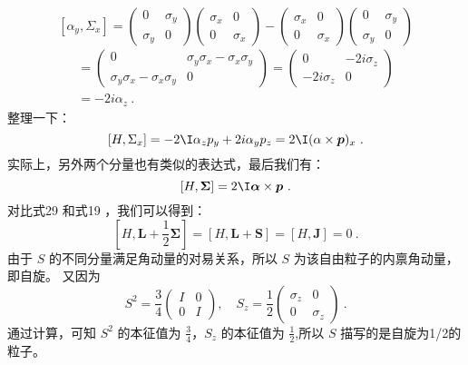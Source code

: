 \begin{equation}
\left[\alpha_{y}, \Sigma_{x}\right] = \left(\begin{array}{cc}
0 & \sigma_{y} \\
\sigma_{y} & 0
\end{array}\right)\left(\begin{array}{cc}
\sigma_{x} & 0 \\
0 & \sigma_{x}
\end{array}\right)-\left(\begin{array}{cc}
\sigma_{x} & 0 \\
0 & \sigma_{x}
\end{array}\right)\left(\begin{array}{cc}
0 & \sigma_{y} \\
\sigma_{y} & 0
\end{array}\right)
\end{equation}
\begin{equation}
\begin{array}{l}
=\left(\begin{array}{cc}
0 & \sigma_{y} \sigma_{x}-\sigma_{x} \sigma_{y} \\
\sigma_{y} \sigma_{x}-\sigma_{x} \sigma_{y} & 0
\end{array}\right)=\left(\begin{array}{cc}
0 & -2 i \sigma_{z} \\
-2 i \sigma_{z} & 0
\end{array}\right) \\
=-2 i \alpha_{z}~.
\end{array}
\end{equation}
整理一下：
\begin{equation}
\left[H, \Sigma_{x}\right]=-2  \I \alpha_{z} p_{y}+2 i \alpha_{y} p_{z}=2  \I(\alpha \times \boldsymbol{p})_{x}~.
\end{equation}
实际上，另外两个分量也有类似的表达式，最后我们有：
\begin{equation}\label{eq_qed4_19}
[H, \mathbf{\Sigma}]=2  \I \boldsymbol{\alpha} \times \boldsymbol{p}~.
\end{equation}
对比式29 和式19 ，我们可以得到：
\begin{equation}
\left[H, \boldsymbol{L}+\frac{1}{2} \boldsymbol{\Sigma}\right]=[H, \boldsymbol{L}+\boldsymbol{S}]=[H, \boldsymbol{J}]=0~.
\end{equation}
由于 $S$ 的不同分量满足角动量的对易关系，所以 $S$ 为该自由粒子的内禀角动量，即自旋。
又因为
\begin{equation}
S^{2}=\frac{3}{4}\left(\begin{array}{ll}
I & 0 \\
0 & I
\end{array}\right), \quad S_{z}=\frac{1}{2}\left(\begin{array}{cc}
\sigma_{z} & 0 \\
0 & \sigma_{z}
\end{array}\right)~.
\end{equation}
通过计算，可知 $S^2$ 的本征值为 $\frac{3}{4}$，$S_{z}$ 的本征值为 $\frac{1}{2}$,所以 $S$ 描写的是自旋为1/2的粒子。

